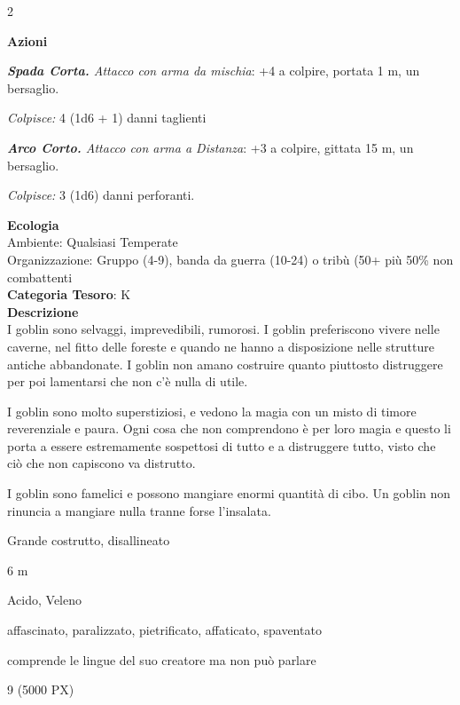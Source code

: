 \begin{multicols}{2}
{\textbf{Azioni}

\emph{\textbf{Spada Corta.} Attacco con arma da mischia}: +4 a colpire, portata 1 m, un bersaglio.

\emph{Colpisce:} 4 (1d6 + 1) danni taglienti

\emph{\textbf{Arco Corto.} Attacco con arma a Distanza}: +3 a colpire, gittata 15 m, un bersaglio.

\emph{Colpisce:} 3 (1d6) danni perforanti.

\textbf{Ecologia}\\
Ambiente: Qualsiasi Temperate\\
Organizzazione: Gruppo (4-9), banda da guerra (10-24) o tribù (50+ più 50\% non combattenti\\
\textbf{Categoria Tesoro}: K\\
\textbf{Descrizione}\\
I goblin sono selvaggi, imprevedibili, rumorosi.
I goblin preferiscono vivere nelle caverne, nel fitto delle foreste e quando ne hanno a disposizione nelle strutture antiche abbandonate. I goblin non amano costruire quanto piuttosto distruggere per poi lamentarsi che non c'è nulla di utile.

I goblin sono molto superstiziosi, e vedono la magia con un misto di timore reverenziale e paura. Ogni cosa che non comprendono è per loro magia e questo li porta a essere estremamente sospettosi di tutto e a distruggere tutto, visto che ciò che non capiscono va distrutto.

I goblin sono famelici e possono mangiare enormi quantità di cibo. Un goblin non rinuncia a mangiare nulla tranne forse l'insalata.

\begin{description}[noitemsep, topsep=0pt, parsep=0pt, partopsep=0pt, itemsep=1pt, leftmargin=2.35cm,  labelwidth=2.2cm, itemindent=0cm, listparindent=0pt] %
\setlength{\baselineskip}{10pt}
\item[\textbf{Taglia/Tipo}] Grande costrutto, disallineato
\item[\textbf{Caratt.}] 
\item[\textbf{Punti Ferita}] 
\item[\textbf{Movimento}] 6 m
\item[\textbf{Tiri Salvez.}] 
\item[\textbf{Imm. Danni}] Acido, Veleno
\item[\textbf{Immunità}] affascinato, paralizzato, pietrificato, affaticato, spaventato
\item[\textbf{Sensi}] 
\item[\textbf{Linguaggi}] comprende le lingue del suo creatore ma non può parlare
\item[\textbf{Sfida}] 9 (5000 PX)
\end{description}
\smallskip

}
\end{multicols}
